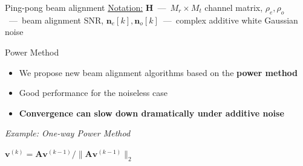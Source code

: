 \documentclass[pdf]{beamer}
\begin{document}
\begin{frame}[t]
\begin{textblock}{0.98}
\begin{tcbraster}[%
    raster columns = 2,
    raster column skip = 0.01\paperwidth,
    raster row skip = 0.01\paperwidth,
    raster equal height=rows
    ]
\begin{mybox}[lower separated=false,sidebyside=false]{Ping-pong beam alignment}
    \vspace*{0.1in}
    \small{\underline{Notation:} $\mathbf{H}$\ ---\ $M_r \times M_t$ channel matrix, $\rho_{e}, \rho_{o}$\ ---\ beam alignment SNR, $\mathbf{n}_{e}[k], \mathbf{n}_{o}[k]$\ ---\ complex additive white Gaussian noise}
  \end{mybox}
  \begin{mybox}[%
    lefthand ratio=0.5,
    sidebyside align=top seam,
    ]{Power Method}
    \addtolength{\leftmargini}{\labelsep}
    \begin{itemize}
    \item We propose new beam alignment algorithms based on the \textbf{power method}
    \item Good performance for the noiseless case
    \item \textbf{Convergence can slow down dramatically under additive noise}
    \end{itemize}
    \tcblower
    \begin{center}
      \small{\emph{Example: One-way Power Method}}
    \end{center}
    \resizebox{\textwidth}{!}{}
    \small{%
      \begin{algorithmic}
        \State $\mathbf{v}^{(k)} = \mathbf{A}\mathbf{v}^{(k-1)}/\|\mathbf{A}\mathbf{v}^{(k-1)}\|_{2}$
        \EndFor
      \end{algorithmic}}
  \end{mybox}


\end{tcbraster}
\end{textblock}
\end{frame}
\end{document}
